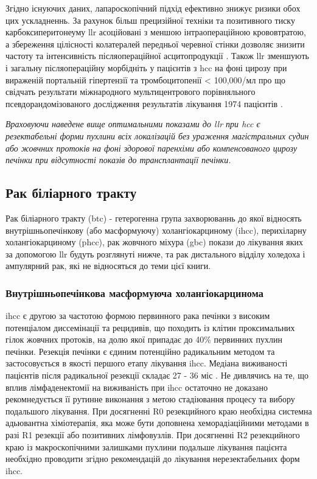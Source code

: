 \begin{refsection}
Згідно існуючих даних, лапароскопічний підхід ефективно знижує ризики обох цих ускладненнь. За рахунок більш прецизійної техніки та позитивного тиску карбоксиперитонеуму \acrshort{llr} асоційовані з меншою інтраопераційною крововтратою, а збереження цілісності колатералей передньої черевної стінки дозволяє знизити частоту та інтенсивність післяопераційної асцитопродукції \cite{Truant2011}. Також \acrshort{llr} зменшують і загальну післяопераційну морбідніть у пацієнтів з \acrshort{hcc} на фоні цирозу при вираженій портальній гіпертензії та тромбоцитопенії < 100,000/мл про що свідчать результати міжнародного мультицентрового порівняльного псевдорандомізованого дослідження результатів лікування 1974 пацієнтів \cite{Ruzzenente2020}.

\emph{Враховуючи наведене вище оптимальними показами до \acrshort{llr} при \acrshort{hcc} є резектабельні форми пухлини всіх локалізацій без ураження магістральних судин або жовчних протоків на фоні здорової паренхіми або компенсованого цирозу печінки при відсутності показів до трансплантації печінки.}

\subsection{Рак біліарного тракту}

Рак біліарного тракту (\acrshort{btc}) - гетерогенна група захворюваннь до якої відносять внутрішньопечінкову (або масформуючу) холангіокарциному (\acrshort{ihcc}), перихіларну холангіокарциному (\acrshort{phcc}), рак жовчного міхура (\acrshort{gbc}) покази до лікування яких за допомогою \acrshort{llr} будуть розглянуті нижче, та рак дистального відділу холедоха і ампулярний рак, які не відносяться до теми цієї книги. 

\subsubsection{Внутрішньопечінкова масформуюча холангіокарцинома}

\acrshort{ihcc} є другою за частотою формою первинного рака печінки з високим потенціалом диссемінації та рецидивів, що походить із клітин проксимальних гілок жовчних протоків, на долю якої припадає до 40\% первинних пухлин печінки. Резекція печінки є єдиним потенційно радикальним методом та застосовується в якості першого етапу лікування \acrshort{ihcc}. Медіана виживаності пацієнтів після радикальної резекції складає 27 - 36 міс \cite{Buettner2017}. Не дивлячись на те, що вплив лімфаденектомії на виживаність при \acrshort{ihcc} остаточно не доказано рекомнедується її рутинне виконання з метою стадіювання процесу та вибору подальшого лікування. При досягненні R0 резекцийного краю необхідна системна адьювантна хіміотерапія, яка може бути доповнена хеморадіаційними методами в разі R1 резекції або позитивних лімфовузлів. При досягненні R2 резекцийного краю із макроскопічними залишками пухлини подальше лікування пацієнта необхідно проводити згідно рекомендацій до лікування нерезектабельних форм \acrshort{ihcc}. 


\end{refsection}
